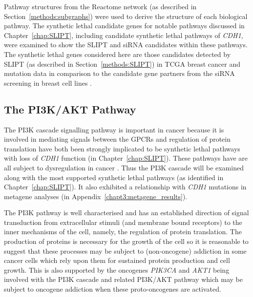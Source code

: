 Pathway structures from the Reactome network (as described in Section~\ref{methods:subgraphs}) were used to derive the  structure of each biological pathway. The \gls{synthetic lethal} candidate genes for notable pathways discussed in Chapter~\ref{chap:SLIPT}, including candidate \gls{synthetic lethal} pathways of \textit{CDH1}, were examined to show the \gls{SLIPT} and \gls{siRNA} candidates within these pathways. The \gls{synthetic lethal} genes considered here are those candidates detected by \gls{SLIPT} (as described in Section~\ref{methods:SLIPT}) in \gls{TCGA} breast cancer  and \gls{mutation} data \citep{TCGA2012} in comparison to the candidate gene partners from the \gls{siRNA} screening in breast cell lines \citep{Telford2015}. 

\FloatBarrier

\subsection{The PI3K/AKT Pathway}  \label{chapt4:SL_Genes_PI3K}

\FloatBarrier

The \acrfull{PI3K} cascade signalling pathway is important in cancer because it is involved in mediating signals between the \glspl{GPCR} and regulation of protein translation have both been strongly implicated to be \gls{synthetic lethal} pathways with loss of \textit{CDH1} function (in Chapter~\ref{chap:SLIPT}). These pathways have are all subject to dysregulation in cancer \citep{Dorsam2007, Courtney2010, Gao2015}. Thus the PI3K cascade will be examined along with the most supported \gls{synthetic lethal} pathways (as identified in Chapter~\ref{chap:SLIPT}). It also exhibited a relationship with \textit{CDH1} mutations in \gls{metagene} analyses (in Appendix~\ref{chapt3:metagene_results}).

The \gls{PI3K} pathway is well characterised and has an established direction of signal transduction from extracellular stimuli (and membrane bound receptors) to the inner mechanisms of the cell, namely, the regulation of protein translation. The production of proteins is necessary for the growth of the cell so it is reasonable to suggest that these processes may be subject to (non-\gls{oncogene}) addiction in some cancer cells which rely upon them for sustained protein production and cell growth. This is also supported by the \glspl{oncogene} \textit{PIK3CA} and \textit{AKT1} being involved with the PI3K cascade and related PI3K/AKT pathway which may be subject to \gls{oncogene addiction} when these proto-oncogenes are activated.

